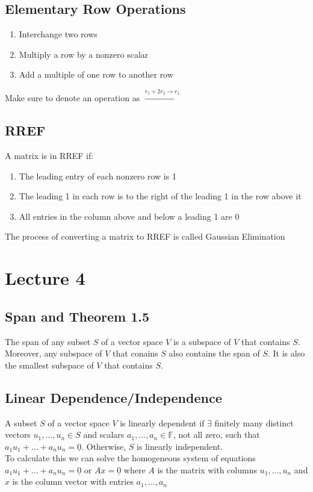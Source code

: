 \documentclass{article}
\begin{document}
\subsection{Elementary Row Operations}
\begin{enumerate}
    \item Interchange two rows
    \item Multiply a row by a nonzero scalar
    \item Add a multiple of one row to another row
\end{enumerate}
Make sure to denote an operation as $\xrightarrow{r_1 + 2r_2 \rightarrow r_1}$

\subsection{RREF}
A matrix is in RREF if:
\begin{enumerate}
    \item The leading entry of each nonzero row is 1
    \item The leading 1 in each row is to the right of the leading 1 in the row above it
    \item All entries in the column above and below a leading 1 are 0
\end{enumerate}
The process of converting a matrix to RREF is called Gaussian Elimination

\section{Lecture 4}
\subsection{Span and Theorem 1.5}
The span of any subset $S$ of a vector space $V$ is a subspace of $V$ that contains $S$. Moreover, any subspace of $V$ that conains $S$ also contains the span of $S$. It is also the smallest subspace of $V$ that contains $S$.

\subsection{Linear Dependence/Independence}
A subset $S$ of a vector space $V$ is linearly dependent if $\exists$ finitely many distinct vectors $u_1, \dots, u_n \in S$ and scalars $a_1, \dots, a_n \in \mathds{F}$, not all zero, such that $a_1u_1 + \dots + a_nu_n = \underline{0}$. Otherwise, $S$ is linearly independent.\\
To calculate this we can solve the homogeneous system of equations $a_1u_1 + \dots + a_nu_n = \underline{0}$ or $Ax = \underline{0}$ where $A$ is the matrix with columns $u_1, \dots, u_n$ and $x$ is the column vector with entries $a_1, \dots, a_n$
\end{document}
